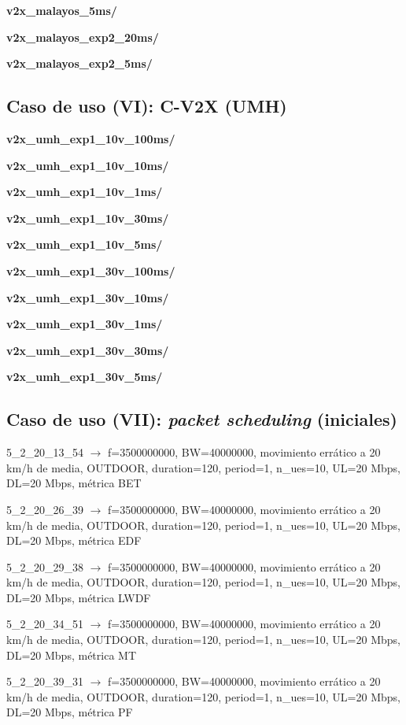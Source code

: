 \documentclass[12pt]{report} %
\begin{document}
\textbf{v2x\_malayos\_5ms/}

\textbf{v2x\_malayos\_exp2\_20ms/}

\textbf{v2x\_malayos\_exp2\_5ms/}

\subsection* {Caso de uso (VI): C-V2X (UMH)}

\textbf{v2x\_umh\_exp1\_10v\_100ms/}

\textbf{v2x\_umh\_exp1\_10v\_10ms/}

\textbf{v2x\_umh\_exp1\_10v\_1ms/}

\textbf{v2x\_umh\_exp1\_10v\_30ms/}

\textbf{v2x\_umh\_exp1\_10v\_5ms/}

\textbf{v2x\_umh\_exp1\_30v\_100ms/}

\textbf{v2x\_umh\_exp1\_30v\_10ms/}

\textbf{v2x\_umh\_exp1\_30v\_1ms/}

\textbf{v2x\_umh\_exp1\_30v\_30ms/}

\textbf{v2x\_umh\_exp1\_30v\_5ms/}

\subsection* {Caso de uso (VII): \textit{packet scheduling} (iniciales)}

5\_2\_20\_13\_54 $\rightarrow$ f=3500000000, BW=40000000, movimiento errático a 20 km/h de media, OUTDOOR, duration=120, period=1, n\_ues=10, UL=20 Mbps, DL=20 Mbps, métrica BET

5\_2\_20\_26\_39 $\rightarrow$ f=3500000000, BW=40000000, movimiento errático a 20 km/h de media, OUTDOOR, duration=120, period=1, n\_ues=10, UL=20 Mbps, DL=20 Mbps, métrica EDF

5\_2\_20\_29\_38 $\rightarrow$ f=3500000000, BW=40000000, movimiento errático a 20 km/h de media, OUTDOOR, duration=120, period=1, n\_ues=10, UL=20 Mbps, DL=20 Mbps, métrica LWDF

5\_2\_20\_34\_51 $\rightarrow$ f=3500000000, BW=40000000, movimiento errático a 20 km/h de media, OUTDOOR, duration=120, period=1, n\_ues=10, UL=20 Mbps, DL=20 Mbps, métrica MT

5\_2\_20\_39\_31 $\rightarrow$ f=3500000000, BW=40000000, movimiento errático a 20 km/h de media, OUTDOOR, duration=120, period=1, n\_ues=10, UL=20 Mbps, DL=20 Mbps, métrica PF
\end{document}
